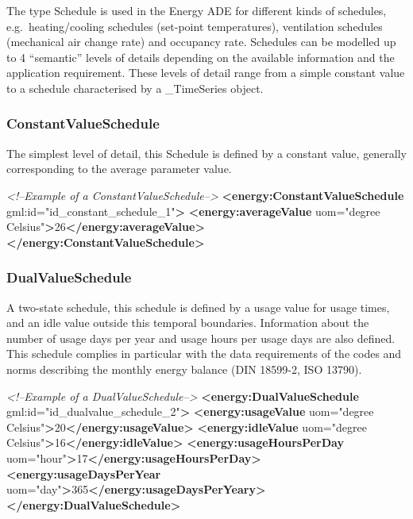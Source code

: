 \documentclass[a4paper,12pt]{article}
\newenvironment{Shaded}{}{}
\newcommand{\KeywordTok}[1]{\textcolor[rgb]{0.00,0.44,0.13}{\textbf{{#1}}}}
\newcommand{\StringTok}[1]{\textcolor[rgb]{0.25,0.44,0.63}{{#1}}}
\newcommand{\CommentTok}[1]{\textcolor[rgb]{0.38,0.63,0.69}{\textit{{#1}}}}
\newcommand{\OtherTok}[1]{\textcolor[rgb]{0.00,0.44,0.13}{{#1}}}
\newcommand{\NormalTok}[1]{{#1}}
\begin{document}
The type Schedule is used in the Energy ADE for different kinds of
schedules, e.g.~heating/cooling schedules (set-point temperatures),
ventilation schedules (mechanical air change rate) and occupancy rate.
Schedules can be modelled up to 4 ``semantic'' levels of details
depending on the available information and the application requirement.
These levels of detail range from a simple constant value to a schedule
characterised by a \_TimeSeries object.

\subsubsection{ConstantValueSchedule}\label{constantvalueschedule}

The simplest level of detail, this Schedule is defined by a constant
value, generally corresponding to the average parameter value.

\begin{Shaded}
\begin{Highlighting}[]
\CommentTok{<!--Example of a ConstantValueSchedule-->}
\KeywordTok{<energy:ConstantValueSchedule}\OtherTok{ gml:id=}\StringTok{"id_constant_schedule_1"}\KeywordTok{>}
    \KeywordTok{<energy:averageValue}\OtherTok{ uom=}\StringTok{"degree Celsius"}\KeywordTok{>}\NormalTok{26}\KeywordTok{</energy:averageValue>}
\KeywordTok{</energy:ConstantValueSchedule>}
\end{Highlighting}
\end{Shaded}

\subsubsection{DualValueSchedule}\label{dualvalueschedule}

A two-state schedule, this schedule is defined by a usage value for
usage times, and an idle value outside this temporal boundaries.
Information about the number of usage days per year and usage hours per
usage days are also defined. This schedule complies in particular with
the data requirements of the codes and norms describing the monthly
energy balance (DIN 18599-2, ISO 13790).

\begin{Shaded}
\begin{Highlighting}[]
\CommentTok{<!--Example of a DualValueSchedule-->}
\KeywordTok{<energy:DualValueSchedule}\OtherTok{ gml:id=}\StringTok{"id_dualvalue_schedule_2"}\KeywordTok{>}
    \KeywordTok{<energy:usageValue}\OtherTok{ uom=}\StringTok{"degree Celsius"}\KeywordTok{>}\NormalTok{20}\KeywordTok{</energy:usageValue>}
    \KeywordTok{<energy:idleValue}\OtherTok{ uom=}\StringTok{"degree Celsius"}\KeywordTok{>}\NormalTok{16}\KeywordTok{</energy:idleValue>}
    \KeywordTok{<energy:usageHoursPerDay}\OtherTok{ uom=}\StringTok{"hour"}\KeywordTok{>}\NormalTok{17}\KeywordTok{</energy:usageHoursPerDay>}
    \KeywordTok{<energy:usageDaysPerYear}\OtherTok{ uom=}\StringTok{"day"}\KeywordTok{>}\NormalTok{365}\KeywordTok{</energy:usageDaysPerYeary>}
\KeywordTok{</energy:DualValueSchedule>}
\end{Highlighting}
\end{Shaded}
\end{document}
